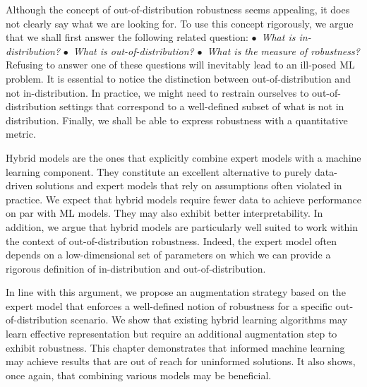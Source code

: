 Although the concept of out-of-distribution robustness seems appealing, it does not clearly say what we are looking for. To use this concept rigorously, we argue that we shall first answer the following related question: $\bullet$~\textit{What is in-distribution?} $\bullet$~\textit{What is out-of-distribution?}  $\bullet$~\textit{What is the measure of robustness?} Refusing to answer one of these questions will inevitably lead to an ill-posed ML problem. It is essential to notice the distinction between out-of-distribution and not in-distribution. In practice, we might need to restrain ourselves to out-of-distribution settings that correspond to a well-defined subset of what is not in distribution. Finally, we shall be able to express robustness with a quantitative metric.

Hybrid models are the ones that explicitly combine expert models with a machine learning component. They constitute an excellent alternative to purely data-driven solutions and expert models that rely on assumptions often violated in practice. We expect that hybrid models require fewer data to achieve performance on par with ML models. They may also exhibit better interpretability. In addition, we argue that hybrid models are particularly well suited to work within the context of out-of-distribution robustness. Indeed, the expert model often depends on a low-dimensional set of parameters on which we can provide a rigorous definition of in-distribution and out-of-distribution.

In line with this argument, we propose an augmentation strategy based on the expert model that enforces a well-defined notion of robustness for a specific out-of-distribution scenario. We show that existing hybrid learning algorithms may learn effective representation but require an additional augmentation step to exhibit robustness. This chapter demonstrates that informed machine learning may achieve results that are out of reach for uninformed solutions. It also shows, once again, that combining various models may be beneficial.

